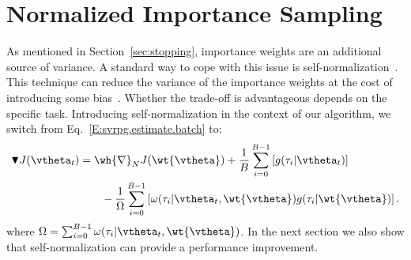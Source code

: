 \section{Normalized Importance Sampling}\label{sec:prac}
\vspace{-0.05in}
As mentioned in Section~\ref{sec:stopping}, importance weights are an additional source of variance. A standard way to cope with this issue is self-normalization~\citep[\eg][]{precup2000eligibility,owenmcbook}.
This technique can reduce the variance of the importance weights at the cost of introducing some bias~\citep[][Chapter 9]{owenmcbook}.
Whether the trade-off is advantageous depends on the specific task.  
Introducing self-normalization in the context of our algorithm, we switch from Eq.~\eqref{E:svrpg.estimate.batch} to:
\begin{align*}
\blacktriangledown J(\vtheta_{t}) &= \wh{\nabla}_N J(\wt{\vtheta}) + \frac{1}{B} \sum_{i=0}^{B-1} \left[g(\tau_i|\vtheta_t)\right]\\ 
&\qquad{} - \frac{1}{\Omega} \sum_{i=0}^{B-1} \left[ \omega(\tau_i|\vtheta_t, \wt{\vtheta}) g(\tau_i|\wt{\vtheta})
\right].
\end{align*}
where $\Omega = \sum_{i=0}^{B-1}\omega(\tau_i|\vtheta_t, \wt{\vtheta})$.
In the next section we also show that self-normalization can provide a performance improvement.

\vspace{-0.05in}
